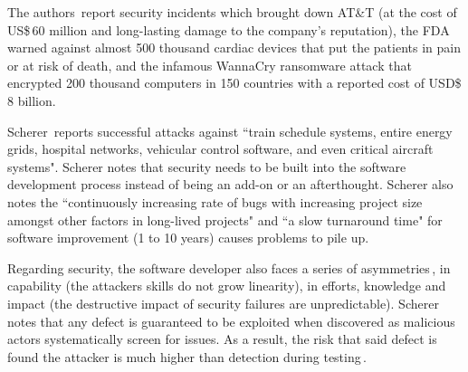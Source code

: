 \documentclass[nomenclature, english, bibtex]{kththesis}
\begin{document}

The authors\,\cite{moy_when_2020} report security incidents which brought down AT\&T (at the cost of US\$\,60 million and long-lasting damage to the company's reputation), the \gls{FDA} warned against almost 500 thousand cardiac devices that put the patients in pain or at risk of death, and the infamous WannaCry ransomware attack that encrypted 200 thousand computers in 150 countries with a reported cost of USD\$\,8 billion.

Scherer\,\cite{scherer_engineering_2021} reports successful attacks against ``train schedule systems, entire energy grids, hospital networks, vehicular control software, and even critical aircraft systems". Scherer notes that security needs to be built into the software development process instead of being an add-on or an afterthought. Scherer also notes the ``continuously increasing rate of bugs with increasing project size amongst other factors in long-lived projects" and ``a slow turnaround time" for software improvement (1 to 10 years) causes problems to pile up.

Regarding security, the software developer also faces a series of asymmetries\,\cite{chapman_adacore_2018}, in capability (the attackers skills do not grow linearity), in efforts, knowledge and impact (the destructive impact of security failures are unpredictable). Scherer notes that any defect is guaranteed to be exploited when discovered as malicious actors systematically screen for issues. As a result, the risk that said defect is found the attacker is much higher than detection during testing\,\cite{scherer_engineering_2021}.
\end{document}
